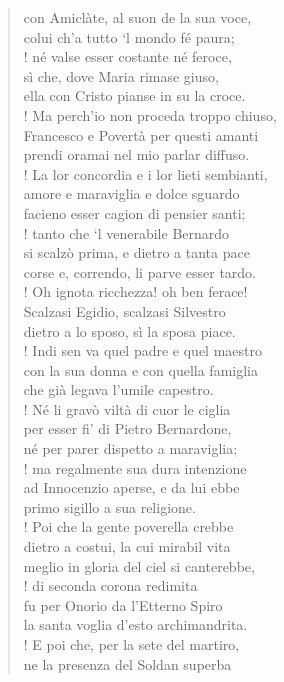 \documentclass[a4paper, twoside, titlepage]{book}
\newcounter{mar}
\begin{document}
\begin{verse}
con Amiclàte, al suon de la sua voce,\\
colui ch’a tutto ‘l mondo fé paura;\\!
né valse esser costante né feroce,\\
sì che, dove Maria rimase giuso,\\
ella con Cristo pianse in su la croce.\\!
Ma perch’io non proceda troppo chiuso,\\
Francesco e Povertà per questi amanti\\
prendi oramai nel mio parlar diffuso.\\!
La lor concordia e i lor lieti sembianti,\\
amore e maraviglia e dolce sguardo\\
facieno esser cagion di pensier santi;\\!
tanto che ‘l venerabile Bernardo\\
si scalzò prima, e dietro a tanta pace\\
corse e, correndo, li parve esser tardo.\\!
Oh ignota ricchezza! oh ben ferace!\\
Scalzasi Egidio, scalzasi Silvestro\\
dietro a lo sposo, sì la sposa piace.\\!
Indi sen va quel padre e quel maestro\\
con la sua donna e con quella famiglia\\
che già legava l’umile capestro.\\!
Né li gravò viltà di cuor le ciglia\\
per esser fi’ di Pietro Bernardone,\\
né per parer dispetto a maraviglia;\\!
ma regalmente sua dura intenzione\\
ad Innocenzio aperse, e da lui ebbe\\
primo sigillo a sua religione.\\!
Poi che la gente poverella crebbe\\
dietro a costui, la cui mirabil vita\\
meglio in gloria del ciel si canterebbe,\\!
di seconda corona redimita\\
fu per Onorio da l’Etterno Spiro\\
la santa voglia d’esto archimandrita.\\!
E poi che, per la sete del martiro,\\
ne la presenza del Soldan superba\\

\end{verse}
\end{document}

